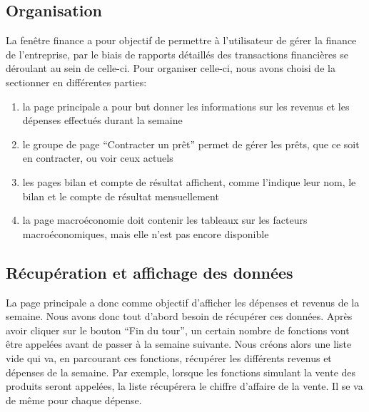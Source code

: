 \subsection{Organisation}



La fenêtre finance a pour objectif de permettre à l’utilisateur de gérer la finance de l’entreprise, par le biais de rapports détaillés des transactions financières se déroulant au sein de celle-ci. Pour organiser celle-ci, nous avons choisi de la sectionner en différentes parties:





\begin{enumerate}
\item la page principale a pour but donner les informations sur les revenus et les dépenses effectués durant la semaine
\item le groupe de page “Contracter un prêt” permet de gérer les prêts, que ce soit en contracter, ou voir ceux actuels
\item les pages bilan et compte de résultat affichent, comme l’indique leur nom, le bilan et le compte de résultat mensuellement
\item la page macroéconomie doit contenir les tableaux sur les facteurs macroéconomiques, mais elle n’est pas encore disponible
\end{enumerate}



\subsection{Récupération et affichage des données}



La page principale a donc comme objectif d’afficher les dépenses et revenus de la semaine. Nous avons donc tout d’abord besoin de récupérer ces données. Après avoir cliquer sur le bouton “Fin du tour”, un certain nombre de fonctions vont être appelées avant de passer à la semaine suivante. Nous créons alors une liste vide qui va, en parcourant ces fonctions, récupérer les différents revenus et dépenses de la semaine. Par exemple, lorsque les fonctions simulant la vente des produits seront appelées, la liste récupérera le chiffre d’affaire de la vente. Il se va de même pour chaque dépense. \\

